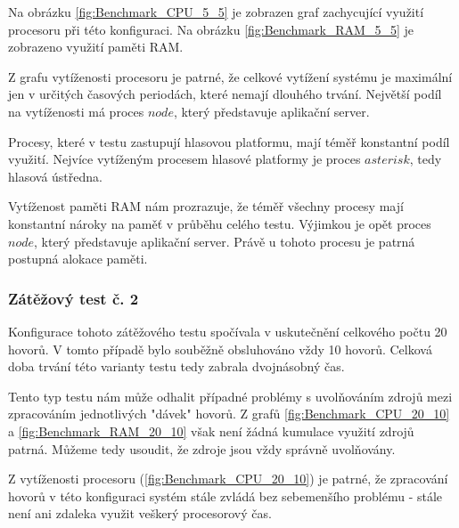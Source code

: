 \documentclass[ing,male,java,dept460,twoside]{diploma}						%
\begin{document}
Na obrázku \ref{fig:Benchmark_CPU_5_5} je zobrazen graf zachycující využití procesoru při této konfiguraci. Na obrázku \ref{fig:Benchmark_RAM_5_5} je zobrazeno využití paměti RAM.


Z grafu vytíženosti procesoru je patrné, že celkové vytížení systému je maximální jen v určitých časových periodách, které nemají dlouhého trvání. Největší podíl na vytíženosti má proces $node$, který představuje aplikační server.

Procesy, které v testu zastupují hlasovou platformu, mají téměř konstantní podíl využití. Nejvíce vytíženým procesem hlasové platformy je proces $asterisk$, tedy hlasová ústředna.

Vytíženost paměti RAM nám prozrazuje, že téměř všechny procesy mají konstantní nároky na paměť v průběhu celého testu. Výjimkou je opět proces $node$, který představuje aplikační server. Právě u tohoto procesu je patrná postupná alokace paměti.

\subsubsection{Zátěžový test č. 2}
Konfigurace tohoto zátěžového testu spočívala v uskutečnění celkového počtu 20 hovorů. V tomto případě bylo souběžně obsluhováno vždy 10 hovorů. Celková doba trvání této varianty testu tedy zabrala dvojnásobný čas.


Tento typ testu nám může odhalit případné problémy s uvolňováním zdrojů mezi zpracováním jednotlivých "dávek" hovorů. Z grafů \ref{fig:Benchmark_CPU_20_10} a \ref{fig:Benchmark_RAM_20_10} však není žádná kumulace využití zdrojů patrná. Můžeme tedy usoudit, že zdroje jsou vždy správně uvolňovány.

Z vytíženosti procesoru (\ref{fig:Benchmark_CPU_20_10}) je patrné, že zpracování hovorů v této konfiguraci systém stále zvládá bez sebemenšího problému - stále není ani zdaleka využit veškerý procesorový čas.
\end{document}
